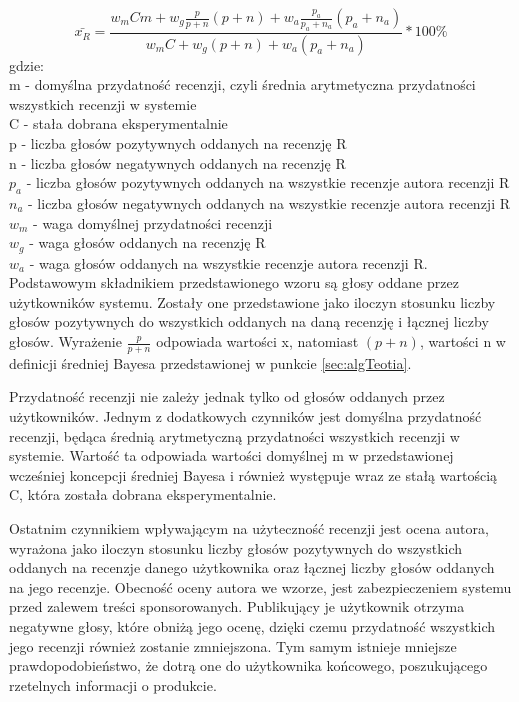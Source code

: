 \begin{equation}
\bar{x_{R}}=\frac{w_{m}Cm+w_{g}\frac{p}{p+n}(p+n)+w_{a}\frac{p_{a}}{p_{a}+n_{a}}(p_{a}+n_{a})}{w_{m}C+w_{g}(p+n)+w_{a}(p_{a}+n_{a})}*100\%
\end{equation}
gdzie:\\
m - domyślna przydatność recenzji, czyli średnia arytmetyczna przydatności wszystkich recenzji w systemie\\
C - stała dobrana eksperymentalnie\\
p - liczba głosów pozytywnych oddanych na recenzję R\\
n - liczba głosów negatywnych oddanych na recenzję R\\
$p_{a}$ - liczba głosów pozytywnych oddanych na wszystkie recenzje autora recenzji R\\
$n_{a}$ - liczba głosów negatywnych oddanych na wszystkie recenzje autora recenzji R\\
$w_{m}$ - waga domyślnej przydatności recenzji\\
$w_{g}$ - waga głosów oddanych na recenzję R\\
$w_{a}$ - waga głosów oddanych na wszystkie recenzje autora recenzji R.\\


Podstawowym składnikiem przedstawionego wzoru są głosy oddane przez użytkowników systemu. Zostały one przedstawione jako iloczyn stosunku liczby głosów pozytywnych do wszystkich oddanych na daną recenzję i łącznej liczby głosów. Wyrażenie $\frac{p}{p+n}$ odpowiada wartości x, natomiast $(p + n)$, wartości n w definicji średniej Bayesa przedstawionej w punkcie \ref{sec:algTeotia}.

Przydatność recenzji nie zależy jednak tylko od głosów oddanych przez użytkowników. Jednym z dodatkowych czynników jest domyślna przydatność recenzji, będąca średnią arytmetyczną przydatności wszystkich recenzji w systemie. Wartość ta odpowiada wartości domyślnej m w przedstawionej wcześniej koncepcji średniej Bayesa i również występuje wraz ze stałą wartością C, która została dobrana eksperymentalnie.

Ostatnim czynnikiem wpływającym na użyteczność recenzji jest ocena autora, wyrażona jako iloczyn stosunku liczby głosów pozytywnych do wszystkich oddanych na recenzje danego użytkownika oraz łącznej liczby głosów oddanych na jego recenzje. Obecność oceny autora we wzorze, jest zabezpieczeniem systemu przed zalewem treści sponsorowanych. Publikujący je użytkownik otrzyma negatywne głosy, które obniżą jego ocenę, dzięki czemu przydatność wszystkich jego recenzji również zostanie zmniejszona. Tym samym istnieje mniejsze prawdopodobieństwo, że dotrą one do użytkownika końcowego, poszukującego rzetelnych informacji o produkcie. 

